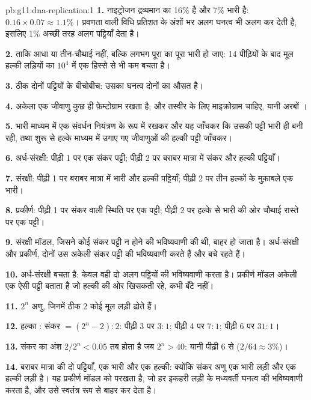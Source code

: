 \begin{solution}{pb:g11:dna-replication:1}
\textbf{1.} नाइट्रोजन द्रव्यमान का 16\% है और 7\% भारी है:
$0.16 \times 0.07 \approx 1.1\%$। प्रवणता वाली विधि प्रतिशत के अंशों भर
अलग घनत्व भी अलग कर देती है, इसलिए 1\% अच्छी तरह अलग पट्टियाँ देता है।

\textbf{2.} ताकि  आधा या तीन-चौथाई नहीं, बल्कि लगभग पूरा का पूरा भारी
हो जाए: 14 पीढ़ियों के बाद मूल हल्की लड़ियों का $10^4$ में एक हिस्से से भी
कम बचता है।

\textbf{3.} ठीक दोनों पट्टियों के बीचोबीच: उसका घनत्व दोनों का औसत है।

\textbf{4.} अकेला एक जीवाणु कुछ ही फ़ेम्टोग्राम  रखता है; और तस्वीर के
लिए माइक्रोग्राम चाहिए, यानी अरबों ।

\textbf{5.} भारी माध्यम में एक संवर्धन नियंत्रण के रूप में रखकर और यह
जाँचकर कि उसकी पट्टी भारी ही बनी रही, तथा शुरू से हल्के माध्यम में उगाए गए
जीवाणुओं की हल्की पट्टी जाँचकर।

\textbf{6.} अर्ध-संरक्षी: पीढ़ी 1 पर एक संकर पट्टी; पीढ़ी 2 पर बराबर
मात्रा में संकर और हल्की पट्टियाँ।

\textbf{7.} संरक्षी: पीढ़ी 1 पर बराबर मात्रा में भारी और हल्की पट्टियाँ;
पीढ़ी 2 पर तीन हल्कों के मुक़ाबले एक भारी।

\textbf{8.} प्रकीर्ण: पीढ़ी 1 पर संकर वाली स्थिति पर एक पट्टी; पीढ़ी 2 पर
हल्के से भारी की ओर चौथाई रास्ते पर एक पट्टी।

\textbf{9.} संरक्षी मॉडल, जिसने कोई संकर पट्टी न होने की भविष्यवाणी की
थी, बाहर हो जाता है। अर्ध-संरक्षी और प्रकीर्ण, दोनों उस अकेली संकर पट्टी
की भविष्यवाणी करते हैं और बचे रहते हैं।

\textbf{10.} अर्ध-संरक्षी बचता है: केवल वही दो अलग पट्टियों की
भविष्यवाणी करता है। प्रकीर्ण मॉडल अकेली एक ऐसी पट्टी बताता है जो हल्की की
ओर खिसकती रहे, कभी बँटे नहीं।

\textbf{11.} $2^n$ अणु, जिनमें ठीक 2 कोई मूल लड़ी ढोते हैं।

\textbf{12.} हल्का : संकर $= (2^n - 2) : 2$: पीढ़ी 3 पर $3:1$; पीढ़ी 4
पर $7:1$; पीढ़ी 6 पर $31:1$।

\textbf{13.} संकर का अंश $2/2^n < 0.05$ तब होता है जब $2^n > 40$: यानी
पीढ़ी 6 से ($2/64 \approx 3\%$)।

\textbf{14.} बराबर मात्रा की दो पट्टियाँ, एक भारी और एक हल्की: क्योंकि
संकर अणु एक भारी लड़ी और एक हल्की लड़ी है। यह प्रकीर्ण मॉडल को परखता है,
जो हर इकहरी लड़ी के मध्यवर्ती घनत्व की भविष्यवाणी करता है, और उसे
स्वतंत्र रूप से बाहर कर देता है।


\end{solution}
